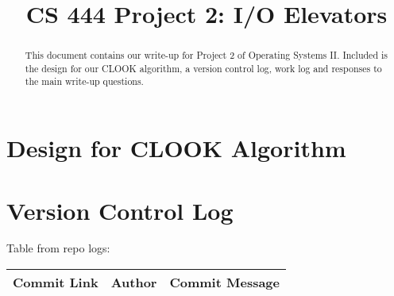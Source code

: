 \documentclass[10pt,letterpaper,draftclsnofoot,onecolumn]{IEEEtran}
\begin{document}

\begin{titlepage}
\title{CS 444 Project 2: I/O Elevators}
\author
{
}
    \maketitle
    \vspace{2cm}
    \begin{abstract}
        \noindent This document contains our write-up for Project 2 of Operating Systems II. Included is the design for our CLOOK algorithm, a version control log, work log and responses to the main write-up questions. 
    \end{abstract}

\end{titlepage}

\section{Design for CLOOK Algorithm}
\noindent{}

\section{Version Control Log}
\noindent Table from repo logs:

\begin{center}
    \begin{tabular}{ | p{8cm} | p{3cm} | p{6cm} |}
    \hline
    Commit Link & Author & Commit Message \\ \hline
    \end{tabular}
\end{center}
\end{document}
